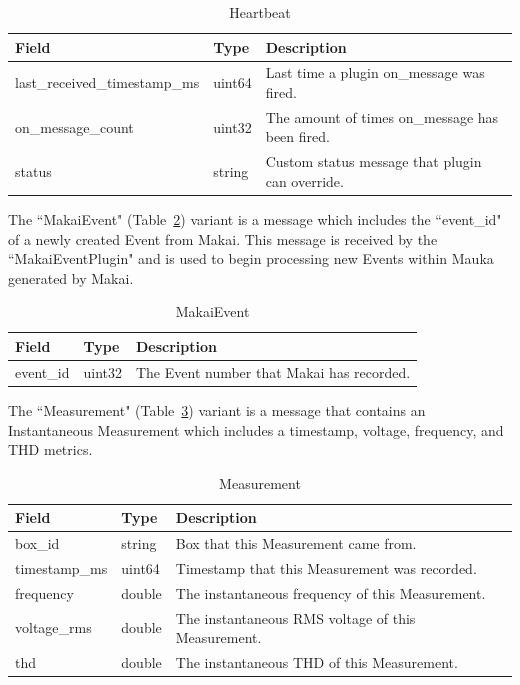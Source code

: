 \begin{table}[H]
	\centering
	\caption{Heartbeat}
	\begin{tabularx}{\textwidth}{llX}
		\toprule
		\textbf{Field} & \textbf{Type} & \textbf{Description} \\
		\midrule
		last\_received\_timestamp\_ms & uint64 & Last time a plugin on\_message was fired.  \\
		on\_message\_count & uint32 & The amount of times on\_message has been fired. \\
		status & string & Custom status message that plugin can override. \\
		\bottomrule
	\end{tabularx}
	\label{table:Heartbeat}
\end{table}

The ``MakaiEvent" (Table~\ref{table:MakaiEvent}) variant is a message which includes the ``event\_id" of a newly created Event from Makai. This message is received by the ``MakaiEventPlugin" and is used to begin processing new Events within Mauka generated by Makai.

\begin{table}[H]
	\centering
	\caption{MakaiEvent}
	\begin{tabularx}{\textwidth}{llX}
		\toprule
		\textbf{Field} & \textbf{Type} & \textbf{Description} \\
		\midrule
		event\_id & uint32 & The Event number that Makai has recorded.  \\
		\bottomrule
	\end{tabularx}
	\label{table:MakaiEvent}
\end{table}

The ``Measurement" (Table~\ref{table:Measurement}) variant is a message that contains an Instantaneous Measurement which includes a timestamp, voltage, frequency, and THD metrics.

\begin{table}[H]
	\centering
	\caption{Measurement}
	\begin{tabularx}{\textwidth}{llX}
		\toprule
		\textbf{Field} & \textbf{Type} & \textbf{Description} \\
		\midrule
		box\_id & string  & Box that this Measurement came from. \\
		timestamp\_ms & uint64 & Timestamp that this Measurement was recorded. \\
		frequency & double & The instantaneous frequency of this Measurement. \\
		voltage\_rms & double & The instantaneous RMS voltage of this Measurement. \\
		thd & double & The instantaneous THD of this Measurement. \\
		\bottomrule
	\end{tabularx}
	\label{table:Measurement}
\end{table}

